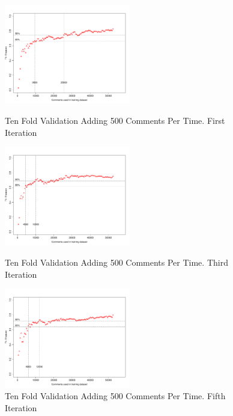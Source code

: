 \clearpage
\begin{figure}[thb!]
  \centering
  \vspace{-3mm}
  \includegraphics[width=0.49\textwidth]{figures/appendix/ten_fold_validation_requirement/ten_fold_validation_0_500.pdf}
  \vspace{-5mm}
  \caption{Ten Fold Validation Adding 500 Comments Per Time. First Iteration}
  \label{fig:requirement_ten_fold_validation_0_100}
  \includegraphics[width=0.49\textwidth]{figures/appendix/ten_fold_validation_requirement/ten_fold_validation_2_500.pdf}
  \vspace{-5mm}
  \caption{Ten Fold Validation Adding 500 Comments Per Time. Third Iteration}
  \label{fig:requirement_ten_fold_validation_2_100}
  \includegraphics[width=0.49\textwidth]{figures/appendix/ten_fold_validation_requirement/ten_fold_validation_4_500.pdf}
  \vspace{-5mm}
  \caption{Ten Fold Validation Adding 500 Comments Per Time. Fifth Iteration}
  \label{fig:requirement_ten_fold_validation_4_100}
\end{figure}

